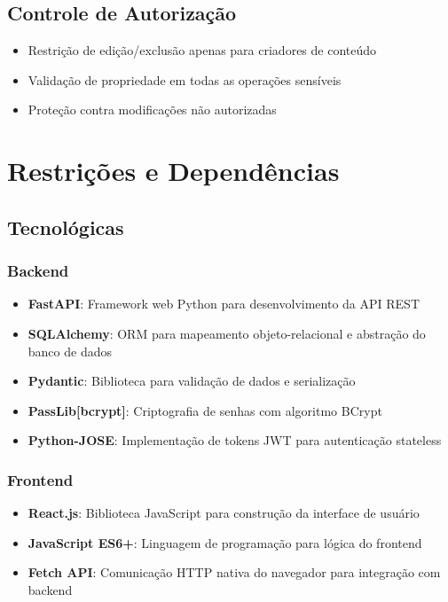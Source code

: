 \documentclass[12pt,a4paper]{article}
\begin{document}
\subsection{Controle de Autorização}
\begin{itemize}
    \item Restrição de edição/exclusão apenas para criadores de conteúdo
    \item Validação de propriedade em todas as operações sensíveis
    \item Proteção contra modificações não autorizadas
\end{itemize}

\section{Restrições e Dependências}

\subsection{Tecnológicas}

\subsubsection{Backend}
\begin{itemize}
    \item \textbf{FastAPI}: Framework web Python para desenvolvimento da API REST
    \item \textbf{SQLAlchemy}: ORM para mapeamento objeto-relacional e abstração do banco de dados
    \item \textbf{Pydantic}: Biblioteca para validação de dados e serialização
    \item \textbf{PassLib[bcrypt]}: Criptografia de senhas com algoritmo BCrypt
    \item \textbf{Python-JOSE}: Implementação de tokens JWT para autenticação stateless
\end{itemize}

\subsubsection{Frontend}
\begin{itemize}
    \item \textbf{React.js}: Biblioteca JavaScript para construção da interface de usuário
    \item \textbf{JavaScript ES6+}: Linguagem de programação para lógica do frontend
    \item \textbf{Fetch API}: Comunicação HTTP nativa do navegador para integração com backend
\end{itemize}
\end{document}
